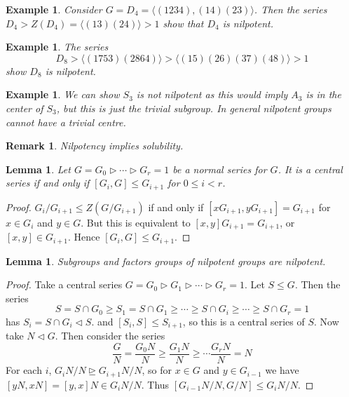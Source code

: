 \documentclass[a4paper,10pt]{article}
\newtheorem{eg}[thm]{Example}
\newtheorem{Lem}[thm]{Lemma}
\newtheorem{rem}[thm]{Remark}
\begin{document}
\begin{eg}
Consider $G = D_4 = \langle (1234), (14)(23) \rangle$. Then the series $D_4 > Z(D_4) = \langle (13)(24) \rangle > 1$ show that $D_4$ is nilpotent. 
\end{eg}

\begin{eg}
The series
\[ D_8 > \langle (1753)(2864) \rangle > \langle (15)(26)(37)(48) \rangle > 1 \]
show $D_8$ is nilpotent.
\end{eg}

\begin{eg}
We can show $S_3$ is not nilpotent as this would imply $A_3$ is in the center of $S_3$, but this is just the trivial subgroup. In general nilpotent groups cannot have a trivial centre. 
\end{eg}

\begin{rem}
Nilpotency implies solubility.  
\end{rem}

\begin{Lem}
Let $G = G_0 \triangleright \cdots \triangleright G_r = 1$ be a normal series for $G$. It is a central series if and only if $[G_i, G] \leq G_{i+1}$ for $0 \leq i < r$.
\end{Lem}

\begin{proof}
$G_i / G_{i+1} \leq Z(G / G_{i+1})$ if and only if $[xG_{i+1}, yG_{i+1}] = G_{i+1}$ for $x \in G_i$ and $y \in G$. But this is equivalent to $[x,y] G_{i+1} = G_{i+1}$, or $[x,y] \in G_{i+1}$. Hence $[G_{i}, G] \leq G_{i+1}$. 
\end{proof}


\begin{Lem}
Subgroups and factors groups of nilpotent groups are nilpotent. 
\end{Lem}

\begin{proof}
Take a central series $G = G_0 \triangleright G_1 \triangleright \cdots \triangleright G_r = 1$. Let $S \leq G$. Then the series
\[ S = S \cap G_0 \geq S_1 = S \cap G_1 \geq \cdots \geq S \cap G_i \geq \cdots \geq S \cap G_r = 1 \]
has $S_i = S \cap G_i \triangleleft S$. and $[S_i, S] \leq S_{i+1}$, so this is a central series of $S$. Now take $N \triangleleft G$. Then consider the series
\[ \frac{G}{N} = \frac{G_0 N}{N} \geq \frac{G_1 N }{N} \geq \cdots \frac{G_r N}{N} = N \]
For each $i$, $G_iN / N \trianglerighteq G_{i+1}N / N$, so for $x \in G$ and $y \in G_{i-1}$ we have $[yN, xN] = [y,x]N \in G_i N / N$. Thus $[ G_{i-1}N / N, G / N ] \leq G_{i}N / N$. 
\end{proof}
\end{document}
